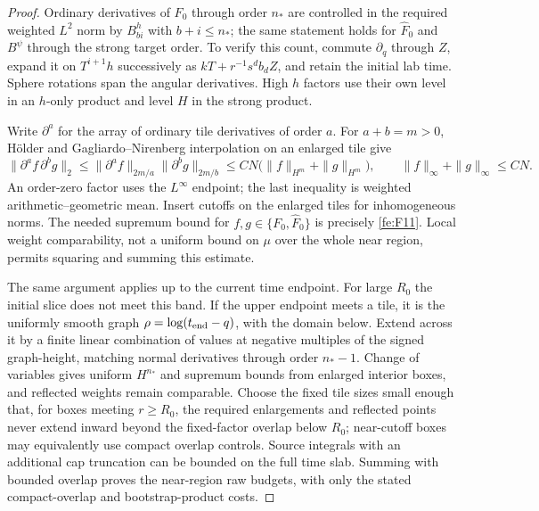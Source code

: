 \begin{proof}
Ordinary derivatives of $F_0$ through order $n_*$ are controlled in
the required weighted $L^2$ norm by $B^h_{bi}$ with $b+i\le n_*$;
the same statement holds for $\widehat F_0$ and $B^\psi$ through
the strong target order.  To verify this count, commute $\partial_q$
through $Z$, expand it on $T^{i+1}h$ successively as
$kT+r^{-1}s^db_dZ$, and retain the initial lab time.  Sphere rotations
span the angular derivatives.  High $h$ factors use their own level
in an $h$-only product and level $H$ in the strong product.

Write $\partial^a$ for the array of ordinary tile derivatives of
order $a$. For $a+b=m>0$, Hölder and Gagliardo--Nirenberg interpolation
on an enlarged tile give
\[
 \|\partial^af\,\partial^bg\|_2
 \le \|\partial^af\|_{2m/a}\|\partial^bg\|_{2m/b}
 \le CN\bigl(\|f\|_{H^m}+\|g\|_{H^m}\bigr),
 \qquad \|f\|_\infty+\|g\|_\infty\le CN.
\]
An order-zero factor uses the $L^\infty$ endpoint; the last inequality
is weighted arithmetic--geometric mean.  Insert cutoffs on the enlarged
tiles for inhomogeneous norms.  The needed supremum bound for
$f,g\in\{F_0,\widehat F_0\}$ is precisely \eqref{fe:F11}.
Local weight comparability, not a uniform bound on $\mu$ over the
whole near region, permits squaring and summing this estimate.

The same argument applies up to the current time endpoint.
For large $R_0$ the initial slice does not meet this band.  If the
upper endpoint meets a tile, it is the uniformly smooth graph
$\rho=\log(t_{\rm end}-q)$, with the domain below.  Extend across
it by a finite linear combination of values at negative multiples
of the signed graph-height, matching normal derivatives through
order $n_*-1$.  Change of variables gives uniform $H^{n_*}$ and
supremum bounds from enlarged interior boxes, and reflected weights
remain comparable.  Choose the fixed tile sizes small enough that,
for boxes meeting $r\ge R_0$, the required enlargements and reflected
points never extend inward beyond the fixed-factor overlap below
$R_0$; near-cutoff boxes may equivalently use compact overlap controls.
Source integrals with an additional
cap truncation can be bounded on the full time slab.  Summing with
bounded overlap proves the near-region raw budgets, with only the
stated compact-overlap and bootstrap-product costs.


\end{proof}

